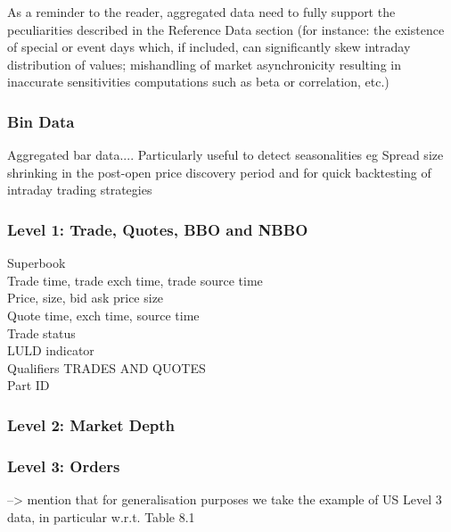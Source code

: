 As a reminder to the reader, aggregated data need to fully support the peculiarities described in the Reference Data section (for instance: the existence of special or event days which, if included, can significantly skew intraday distribution of values; mishandling of market asynchronicity resulting in inaccurate sensitivities computations such as beta or correlation, etc.)

\subsubsection{Bin Data}

Aggregated bar data....
Particularly useful to detect seasonalities eg Spread size shrinking in the post-open price discovery period and for quick backtesting of intraday trading strategies

\subsubsection{Level 1: Trade, Quotes, BBO and NBBO}

Superbook \\
Trade time, trade exch time, trade source time \\
Price, size, bid ask price size \\
Quote time, exch time, source time \\
Trade status \\
LULD indicator \\
Qualifiers TRADES AND QUOTES \\
Part ID

\subsubsection{Level 2: Market Depth}


\subsubsection{Level 3: Orders}

--> mention that for generalisation purposes we take the example of US Level 3 data, in particular w.r.t. Table 8.1  \\

